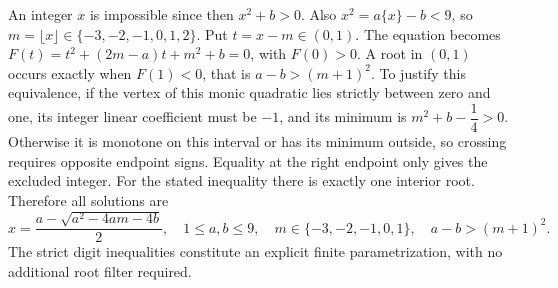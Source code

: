 An integer $x$ is impossible since then $x^2+b>0$. Also $x^2=a\{x\}-b<9$, so $m=\lfloor x\rfloor\in\{-3,-2,-1,0,1,2\}$. Put $t=x-m\in(0,1)$. The equation becomes $F(t)=t^2+(2m-a)t+m^2+b=0$, with $F(0)>0$. A root in $(0,1)$ occurs exactly when $F(1)<0$, that is $a-b>(m+1)^2$. To justify this equivalence, if the vertex of this monic quadratic lies strictly between zero and one, its integer linear coefficient must be $-1$, and its minimum is $m^2+b-\dfrac{1}{4}>0$. Otherwise it is monotone on this interval or has its minimum outside, so crossing requires opposite endpoint signs. Equality at the right endpoint only gives the excluded integer. For the stated inequality there is exactly one interior root. Therefore all solutions are
\[\boxed{x=\dfrac{a-\sqrt{a^2-4am-4b}}{2},\quad 1\le a,b\le9,\quad m\in\{-3,-2,-1,0,1\},\quad a-b>(m+1)^2.}\]
The strict digit inequalities constitute an explicit finite parametrization, with no additional root filter required.
